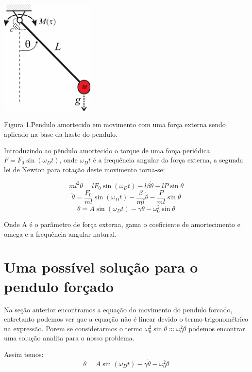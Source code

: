 \documentclass[dvipsnames,a4paper,11pt]{article}
\begin{document}
\begin{center}
	\includegraphics[width=1.85in,height=2.30in,keepaspectratio = false]{nonlinear-pendulum.png}
	
	\scriptsize Figura 1.Pendulo amortecido em movimento com uma força externa sendo aplicado na base da haste do pendulo. 
	
\end{center}

Introduzindo ao pêndulo amortecido o torque de uma força periódica $F = F_0\sin(\omega_D{t})$, onde $\omega_D{t}$ é a frequência angular da força externa, a segunda lei de Newton para rotação deste movimento torna-se:

\[	ml^2\ddot{\theta} = lF_0\sin(\omega_D{t}) -l\beta\dot{\theta} -lP\sin\theta \]
\[\ddot{\theta} = \frac{F_0}{ml}\sin(\omega_D{t}) - \frac{\beta}{ml}\dot{\theta} -\frac{P}{ml}\sin\theta\]
\begin{equation}
	\ddot{\theta} = A\sin(\omega_D{t}) -\gamma\dot{\theta} -\omega_{0}^2\sin\theta
\end{equation}

Onde A é o parâmetro de força externa, gama o coeficiente de amortecimento e omega e a frequência angular natural.

\section{Uma possível solução para o pendulo forçado}

Na seção anterior encontramos a equação do movimento do pendulo forcado, entretanto podemos ver que a equação não é linear devido o termo trigonométrico na expressão. Porem se considerarmos o termo $\omega_{0}^2\sin\theta \approx \omega_{0}^2\theta$ podemos encontrar uma solução analita para o nosso problema.

Assim temos:
\begin{equation}
\ddot{\theta} = A\sin(\omega_D{t}) -\gamma\dot{\theta} -\omega_{0}^2\theta
\end{equation}
\end{document}
